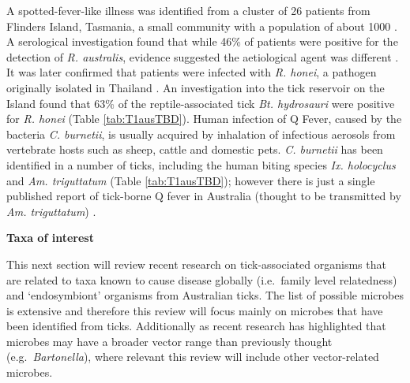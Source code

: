 \documentclass[a4paper, nobind]{templates/ociamthesis}
\begin{document}
A spotted-fever-like illness was identified from a cluster of 26 patients from Flinders Island, Tasmania, a small community with a population of about 1000 \autocite{stewartFlindersIslandSpotted1991}.
A serological investigation found that while 46\% of patients were positive for the detection of \emph{R. australis}, evidence suggested the aetiological agent was different \autocite{gravesSpottedFeverGroup1993}.
It was later confirmed that patients were infected with \emph{R. honei}, a pathogen originally isolated in Thailand \autocite{gravesRickettsiaHonei2003}.
An investigation into the tick reservoir on the Island found that 63\% of the reptile-associated tick \emph{Bt. hydrosauri} were positive for \emph{R. honei} \autocite{stenosAponommaHydrosauriReptileassociated2003} (Table \ref{tab:T1ausTBD}).
Human infection of Q Fever, caused by the bacteria \emph{C. burnetii}, is usually acquired by inhalation of infectious aerosols from vertebrate hosts such as sheep, cattle and domestic pets.
\emph{C. burnetii} has been identified in a number of ticks, including the human biting species \emph{Ix. holocyclus} \autocite{gravesIxodesHolocyclusTicktransmitted2016} and \emph{Am. triguttatum} \autocite{popeCoxiellaBurnetiKangaroos1960,cooperSerologicalEvidenceCoxiella2012} (Table \ref{tab:T1ausTBD}); however there is just a single published report of tick-borne Q fever in Australia (thought to be transmitted by \emph{Am. triguttatum}) \autocite{beamanPericarditisAssociatedTickborne1989}.

\newpage

\textbf{Taxa of interest}

This next section will review recent research on tick-associated organisms that are related to taxa known to cause disease globally (i.e.~family level relatedness) and `endosymbiont' organisms from Australian ticks.
The list of possible microbes is extensive and therefore this review will focus mainly on microbes that have been identified from ticks.
Additionally as recent research has highlighted that microbes may have a broader vector range than previously thought (e.g.~\emph{Bartonella}), where relevant this review will include other vector-related microbes.
\end{document}
